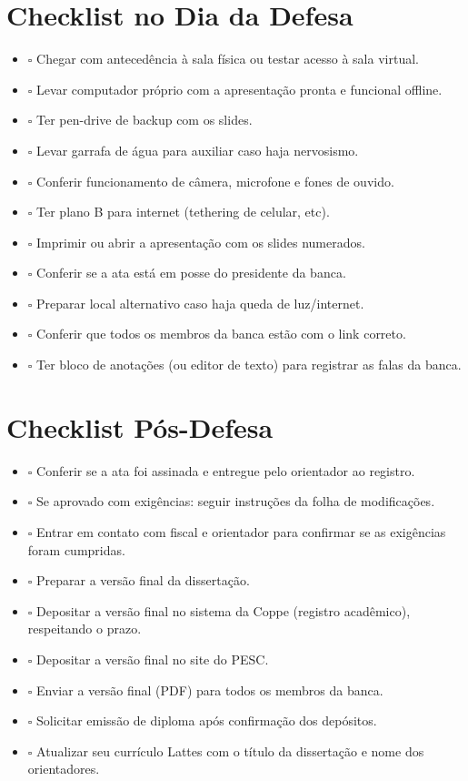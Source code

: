 \documentclass[a4paper,12pt]{article}
\begin{document}
\section{Checklist no Dia da Defesa}

\begin{itemize}
    \item $\square$ Chegar com antecedência à sala física ou testar acesso à sala virtual.
    \item $\square$ Levar computador próprio com a apresentação pronta e funcional offline.
    \item $\square$ Ter pen-drive de backup com os slides.
    \item $\square$ Levar garrafa de água para auxiliar caso haja nervosismo.
    \item $\square$ Conferir funcionamento de câmera, microfone e fones de ouvido.
    \item $\square$ Ter plano B para internet (tethering de celular, etc).
    \item $\square$ Imprimir ou abrir a apresentação com os slides numerados.
    \item $\square$ Conferir se a ata está em posse do presidente da banca.
    \item $\square$ Preparar local alternativo caso haja queda de luz/internet.
    \item $\square$ Conferir que todos os membros da banca estão com o link correto.
    \item $\square$ Ter bloco de anotações (ou editor de texto) para registrar as falas da banca.
\end{itemize}
\clearpage

\section{Checklist Pós-Defesa}

\begin{itemize}
    \item $\square$ Conferir se a ata foi assinada e entregue pelo orientador ao registro.
    \item $\square$ Se aprovado com exigências: seguir instruções da folha de modificações.
    \item $\square$ Entrar em contato com fiscal e orientador para confirmar se as exigências foram cumpridas.
    \item $\square$ Preparar a versão final da dissertação.
    \item $\square$ Depositar a versão final no sistema da Coppe (registro acadêmico), respeitando o prazo.
    \item $\square$ Depositar a versão final no site do PESC.
    \item $\square$ Enviar a versão final (PDF) para todos os membros da banca.
    \item $\square$ Solicitar emissão de diploma após confirmação dos depósitos.
    \item $\square$ Atualizar seu currículo Lattes com o título da dissertação e nome dos orientadores.
\end{itemize}
\end{document}
